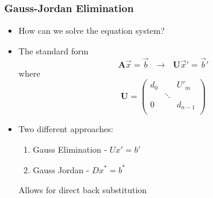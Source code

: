 \documentclass[10pt]{beamer}
\begin{document}
\begin{frame}
  \frametitle{Gauss-Jordan Elimination}
  \begin{itemize}
  \item How can we solve the equation system? 
  \item The standard form
    \[
      \mathbf{A} \vec{x} = \vec{b} ~~~ \rightarrow ~~~ \mathbf{U} \vec{x}' = \vec{b}'
    \]
    where
    \[
      \mathbf{U} = \left(
        \begin{array}{ccc}
          d_0 & & U'_m\\
              & \ddots & \\
          0   &        & d_{n-1}\\
        \end{array}\right)
    \]
    \pause
  \item Two different approaches:
    \begin{enumerate}
    \item Gauss Elimination - $ U x' = b'$
    \item Gauss Jordan - $ D x^* = b^*$
    \end{enumerate}
    Allows for direct back substitution
  \end{itemize}
\end{frame}
\end{document}
